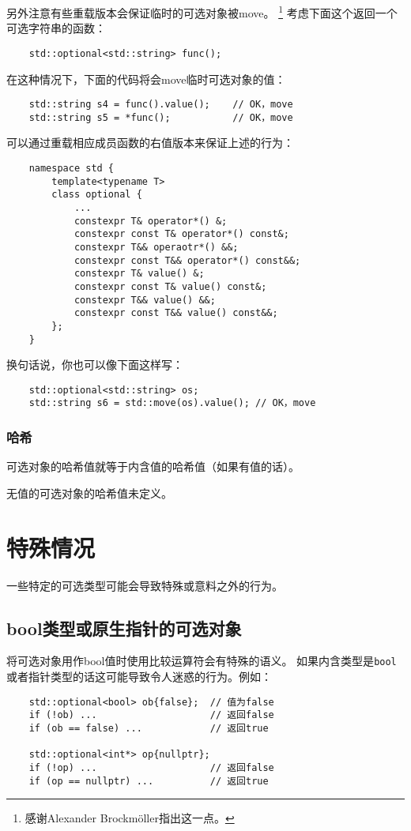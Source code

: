 另外注意有些重载版本会保证临时的可选对象被move。
\footnote{感谢Alexander Brockmöller指出这一点。}
考虑下面这个返回一个可选字符串的函数：
\begin{lstlisting}
    std::optional<std::string> func();
\end{lstlisting}
在这种情况下，下面的代码将会move临时可选对象的值：
\begin{lstlisting}
    std::string s4 = func().value();    // OK，move
    std::string s5 = *func();           // OK，move
\end{lstlisting}
可以通过重载相应成员函数的右值版本来保证上述的行为：
\begin{lstlisting}
    namespace std {
        template<typename T>
        class optional {
            ...
            constexpr T& operator*() &;
            constexpr const T& operator*() const&;
            constexpr T&& operaotr*() &&;
            constexpr const T&& operator*() const&&;
            constexpr T& value() &;
            constexpr const T& value() const&;
            constexpr T&& value() &&;
            constexpr const T&& value() const&&;
        };
    }
\end{lstlisting}
换句话说，你也可以像下面这样写：
\begin{lstlisting}
    std::optional<std::string> os;
    std::string s6 = std::move(os).value(); // OK，move
\end{lstlisting}

\subsubsection{哈希}
可选对象的哈希值就等于内含值的哈希值（如果有值的话）。

无值的可选对象的哈希值未定义。


\section{特殊情况}
一些特定的可选类型可能会导致特殊或意料之外的行为。

\subsection{bool类型或原生指针的可选对象}\label{ch15.3.1}
将可选对象用作bool值时使用比较运算符会有特殊的语义。
如果内含类型是\texttt{bool}或者指针类型的话这可能导致令人迷惑的行为。例如：
\begin{lstlisting}
    std::optional<bool> ob{false};  // 值为false
    if (!ob) ...                    // 返回false
    if (ob == false) ...            // 返回true

    std::optional<int*> op{nullptr};
    if (!op) ...                    // 返回false
    if (op == nullptr) ...          // 返回true
\end{lstlisting}

